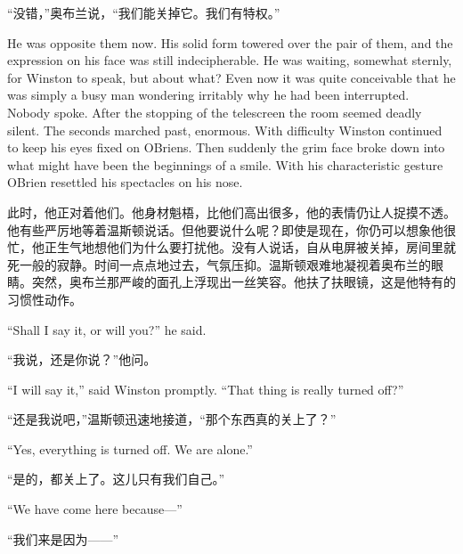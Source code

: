 \begin{paracol}{2}
\switchcolumn

``没错，''奥布兰说，``我们能关掉它。我们有特权。''

\switchcolumn*

He was opposite them now. His solid form towered over the pair of them,
and the expression on his face was still indecipherable. He was waiting,
somewhat sternly, for Winston to speak, but about what? Even now it was
quite conceivable that he was simply a busy man wondering irritably why
he had been interrupted. Nobody spoke. After the stopping of the
telescreen the room seemed deadly silent. The seconds marched past,
enormous. With difficulty Winston continued to keep his eyes fixed on
O\textquotesingle Brien\textquotesingle s. Then suddenly the grim face
broke down into what might have been the beginnings of a smile. With his
characteristic gesture O\textquotesingle Brien resettled his spectacles
on his nose.

\switchcolumn

此时，他正对着他们。他身材魁梧，比他们高出很多，他的表情仍让人捉摸不透。他有些严厉地等着温斯顿说话。但他要说什么呢？即使是现在，你仍可以想象他很忙，他正生气地想他们为什么要打扰他。没有人说话，自从电屏被关掉，房间里就死一般的寂静。时间一点点地过去，气氛压抑。温斯顿艰难地凝视着奥布兰的眼睛。突然，奥布兰那严峻的面孔上浮现出一丝笑容。他扶了扶眼镜，这是他特有的习惯性动作。

\switchcolumn*

``Shall I say it, or will you?'' he said.

\switchcolumn

``我说，还是你说？''他问。

\switchcolumn*

``I will say it,'' said Winston promptly. ``That thing is really turned
off?''

\switchcolumn

``还是我说吧，''温斯顿迅速地接道，``那个东西真的关上了？''

\switchcolumn*

``Yes, everything is turned off. We are alone.''

\switchcolumn

``是的，都关上了。这儿只有我们自己。''

\switchcolumn*

``We have come here because---''

\switchcolumn

``我们来是因为——''

\switchcolumn*


\end{paracol}
